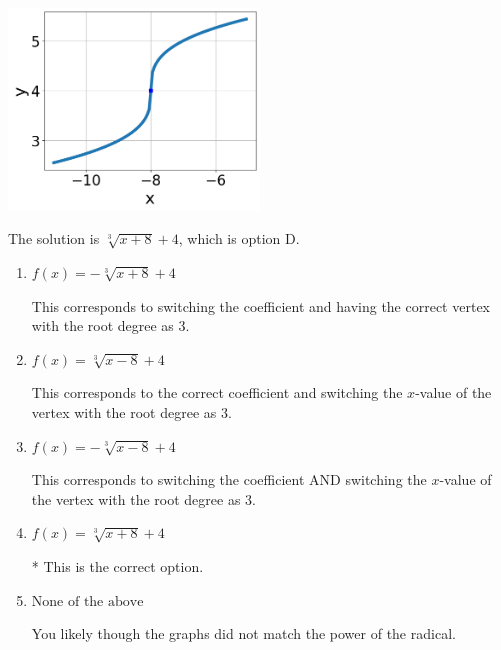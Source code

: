 \documentclass{extbook}[14pt]
\begin{document}
\begin{enumerate}
{\begin{center}
    \includegraphics[width=0.5\textwidth]{../Figures/radicalGraphToEquationB.png}
\end{center}


The solution is \( \sqrt[3]{x + 8} + 4 \), which is option D.\begin{enumerate}[label=\Alph*.]
\item \( f(x) = - \sqrt[3]{x + 8} + 4 \)

This corresponds to switching the coefficient and having the correct vertex with the root degree as $3$.
\item \( f(x) = \sqrt[3]{x - 8} + 4 \)

This corresponds to the correct coefficient and switching the $x$-value of the vertex with the root degree as $3$.
\item \( f(x) = - \sqrt[3]{x - 8} + 4 \)

This corresponds to switching the coefficient AND switching the $x$-value of the vertex with the root degree as $3$.
\item \( f(x) = \sqrt[3]{x + 8} + 4 \)

* This is the correct option.
\item \( \text{None of the above} \)

You likely though the graphs did not match the power of the radical.
\end{enumerate}

}
\end{enumerate}
\end{document}
